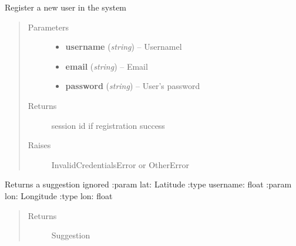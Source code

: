 \documentclass[letterpaper,10pt,english]{sphinxmanual}
\begin{document}

\begin{fulllineitems}
\label{api:apps.api.views.api_register}
Register a new user in the system
\begin{quote}\begin{description}
\item[{Parameters}] \leavevmode\begin{itemize}
\item {} 
\textbf{username} (\emph{string}) -- Usernamel

\item {} 
\textbf{email} (\emph{string}) -- Email

\item {} 
\textbf{password} (\emph{string}) -- User's password

\end{itemize}

\item[{Returns}] \leavevmode
session id if registration success

\item[{Raises }] \leavevmode
InvalidCredentialsError or OtherError

\end{description}\end{quote}

\end{fulllineitems}


\begin{fulllineitems}
\label{api:apps.api.views.api_suggestion_detail}
Returns a suggestion
ignored
:param lat: Latitude
:type username: float
:param lon: Longitude 
:type lon: float
\begin{quote}\begin{description}
\item[{Returns}] \leavevmode
Suggestion

\end{description}\end{quote}

\end{fulllineitems}

\end{document}
